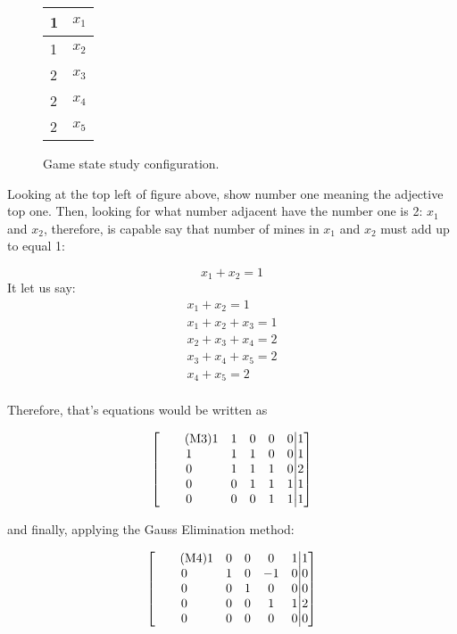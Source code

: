 \documentclass[a4paper]{article}
\numberwithin{equation}{subsection}
\begin{document}
\begin{figure}[h!] \label{fig:1}
\centering
\begin{tabular}{|l|l|}
\hline
1 & $x_1$ \\ \hline
1 & $x_2$ \\ \hline
2 & $x_3$ \\ \hline
2 & $x_4$ \\ \hline
2 & $x_5$ \\ \hline
\end{tabular}
\caption{Game state study configuration.}
\label{fig:1}
\end{figure}

Looking at the top left of figure above, show number one meaning the adjective top one. Then, looking for what number adjacent have the number one is 2: $x_1$ and $x_2$, therefore, is capable say that number of mines in $x_1$ and $x_2$ must add up to equal 1:

\begin{equation}
x_1+x_2=1\label{eq:first}    \tag{1.5}
\end{equation}
It let us say:
\begin{align} 
x_1+x_2=1 \\        \tag{1.5}    
x_1+x_2+x_3=1 \\    \tag{2.1}  
x_2+x_3+x_4=2   \\    \tag{2.2}
x_3+x_4+ x_5=2   \\    \tag{2.3}
x_4+x_5=2      \\       \tag{2.4}
\end{align}

Therefore, that's equations would be written as 

\begin{equation}
\begin{bmatrix} \tag{M3}
1 & 1 & 0 & 0 & 0 $\big\vert$1 \\
1 & 1 & 1 & 0 & 0 $\big\vert$1  \\
0 & 1 & 1 & 1 & 0 $\big\vert$2 \\
0 & 0 & 1 & 1 & 1 $\big\vert$1 \\
0 & 0 & 0 & 1 & 1 $\big\vert$1
\end{bmatrix} 
\end{equation}

\vspace{5mm} %

and finally, applying the Gauss Elimination method:

\begin{equation}
\begin{bmatrix} \tag{M4}
1 & 0 & 0 & 0 & 1 $\big\vert$1 \\
0 & 1 & 0 & -1 & 0 $\big\vert$0  \\
0 & 0 & 1 & 0 & 0 $\big\vert$0 \\
0 & 0 & 0 & 1 & 1 $\big\vert$2 \\
0 & 0 & 0 & 0 & 0 $\big\vert$0
\end{bmatrix}
\end{equation}
\end{document}
